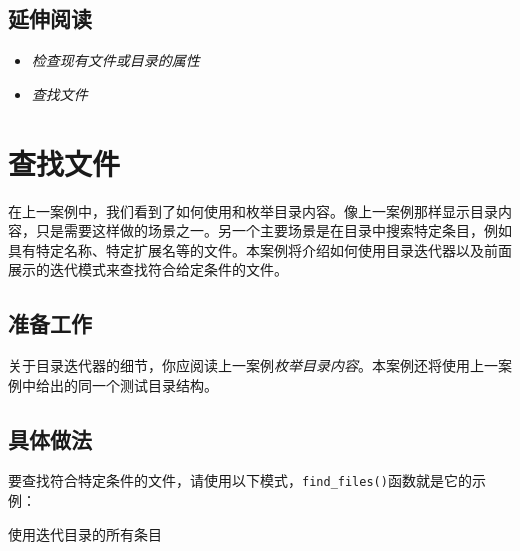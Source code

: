 
\subsection{延伸阅读}



\begin{itemize}
\item \textit{检查现有文件或目录的属性}



\item \textit{查找文件}

\end{itemize}



\section{查找文件}



在上一案例中，我们看到了如何使用和枚举目录内容。像上一案例那样显示目录内容，只是需要这样做的场景之一。另一个主要场景是在目录中搜索特定条目，例如具有特定名称、特定扩展名等的文件。本案例将介绍如何使用目录迭代器以及前面展示的迭代模式来查找符合给定条件的文件。



\subsection{准备工作}



关于目录迭代器的细节，你应阅读上一案例\textit{枚举目录内容}。本案例还将使用上一案例中给出的同一个测试目录结构。



\subsection{具体做法}



要查找符合特定条件的文件，请使用以下模式，\texttt{find\_\allowbreak{}files()}函数就是它的示例：



使用迭代目录的所有条目


